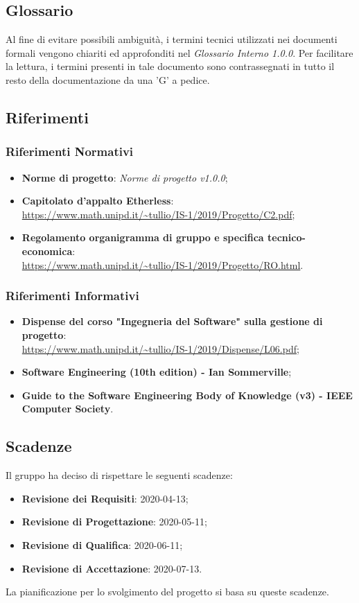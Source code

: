 \subsection{Glossario}
Al fine di evitare possibili ambiguità, i termini tecnici utilizzati nei documenti formali vengono chiariti ed approfonditi nel \textit{Glossario Interno 1.0.0}. Per facilitare la lettura, i termini presenti in tale documento sono contrassegnati in tutto il resto della documentazione da una 'G' a pedice.
\subsection{Riferimenti}
\subsubsection{Riferimenti Normativi}
\begin{itemize}
	\item \textbf{Norme di progetto}: \textit{Norme di progetto v1.0.0};
	\item \textbf{Capitolato d'appalto Etherless}:\\\url{https://www.math.unipd.it/~tullio/IS-1/2019/Progetto/C2.pdf};
	\item \textbf{Regolamento organigramma di gruppo e specifica tecnico-economica}:\\\url{https://www.math.unipd.it/~tullio/IS-1/2019/Progetto/RO.html}.
\end{itemize}
\subsubsection{Riferimenti Informativi}
\begin{itemize}
	\item \textbf{Dispense del corso "Ingegneria del Software" sulla gestione di progetto}:\\\url{https://www.math.unipd.it/~tullio/IS-1/2019/Dispense/L06.pdf};
	\item \textbf{Software Engineering (10th edition) - Ian Sommerville};
	\item \textbf{Guide to the Software Engineering Body of Knowledge (v3) - IEEE Computer Society}.
\end{itemize}
\subsection{Scadenze}
Il gruppo \Gruppo{} ha deciso di rispettare le seguenti scadenze:
\begin{itemize}
	\item \textbf{Revisione dei Requisiti}: 2020-04-13;
	\item \textbf{Revisione di Progettazione}: 2020-05-11;
	\item \textbf{Revisione di Qualifica}: 2020-06-11;
	\item \textbf{Revisione di Accettazione}: 2020-07-13.
\end{itemize}
La pianificazione per lo svolgimento del progetto si basa su queste scadenze.